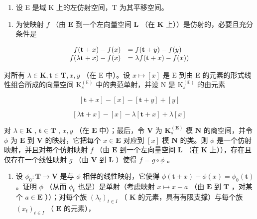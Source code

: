 \begin{enumerate}
\def\labelenumi{\arabic{enumi}.}
\setcounter{enumi}{7}
\tightlist
\item
  设 E 是域 K 上的左仿射空间，T 为其平移空间。
\end{enumerate}

\begin{enumerate}
\def\labelenumi{(\alph{enumi})}
\tightlist
\item
  为使映射 \(f\) （由 \(\mathbf{E}\) 到一个左向量空间 \(\mathbf{L}\) （在 \(\mathbf{K}\) 上））是仿射的，必要且充分条件是
\end{enumerate}

\[
\begin{array}{r l} f (\mathbf {t} + x) - f (x) & = f (\mathbf {t} + y) - f (y) \\ f (\lambda \mathbf {t} + x) - f (x) & = \lambda f (\mathbf {t} + x) - f (x)) \end{array}
\]

对所有 \(\lambda\in\mathbf{K},\mathbf{t}\in\mathbf{T},x,y\) （在 E 中）。设 \(x\mapsto[x]\) 是 E 到由 E 的元素的形式线性组合所成的向量空间 \(\mathrm{K}_{s}^{(\mathbb{E})}\) 中的典范单射，并设 N 是 \(\mathrm{K}_{s}^{(\mathbb{E})}\) 的由元素

\[
[ \mathbf {t} + x ] - [ x ] - [ \mathbf {t} + y ] + [ y ]
\]

\[
[ \lambda \mathbf {t} + x ] - [ x ] - \lambda [ \mathbf {t} + x ] + \lambda [ x ]
\]

对 \(\lambda \in \mathbf{K}\) , \(\mathbf{t} \in \mathbf{T}\) , \(x, y\) （在 \(\mathbf{E}\) 中）；最后，令 \(\mathbf{V}\) 为 \(\mathbf{K}_s^{(\mathbf{E})}\) 模 \(\mathbf{N}\) 的商空间，并令 \(\phi\) 为 \(\mathbf{E}\) 到 \(\mathbf{V}\) 的映射，它把每个 \(x \in \mathbf{E}\) 对应到 \([x]\) 模 \(\mathbf{N}\) 的类。则 \(\phi\) 是一个仿射映射，并且对每个仿射映射 \(f\) （由 \(\mathbf{E}\) 到一个左向量空间 \(\mathbf{L}\) （在 \(\mathbf{K}\) 上）），存在且仅存在一个线性映射 \(g\) （由 \(\mathbf{V}\) 到 \(\mathbf{L}\) ）使得 \(f = g \circ \phi\) 。

\begin{enumerate}
\def\labelenumi{(\alph{enumi})}
\setcounter{enumi}{1}
\tightlist
\item
  设 \(\phi_0: \mathbf{T} \to \mathbf{V}\) 是与 \(\phi\) 相伴的线性映射，它使得 \(\phi(\mathbf{t} + x) - \phi(x) = \phi_0(\mathbf{t})\) 。证明 \(\phi\) （从而 \(\phi_0\) 也是）是单射（考虑映射 \(x \mapsto x - a\) （由 \(\mathbf{E}\) 到 \(\mathbf{T}\) ，对某个 \(a \in \mathbf{E}\) ））；对每个族 \((\lambda_t)_{t \in I}\) （ \(\mathbf{K}\) 的元素，具有有限支撑）与每个族 \((x_t)_{t \in I}\) （ \(\mathbf{E}\) 的元素），
\end{enumerate}

